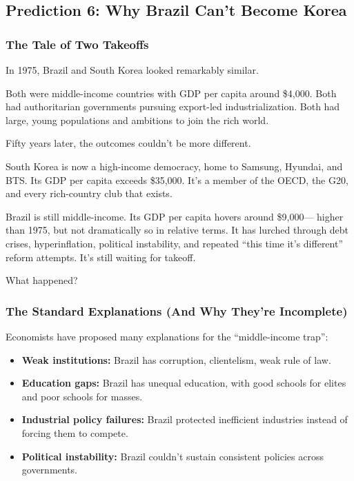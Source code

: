 \subsection{Prediction 6: Why Brazil Can't Become Korea}
\label{subsec:pred6-coherence-trap}


\subsubsection{The Tale of Two Takeoffs}

In 1975, Brazil and South Korea looked remarkably similar.

Both were middle-income countries with GDP per capita around \$4,000. 
Both had authoritarian governments pursuing export-led industrialization. 
Both had large, young populations and ambitions to join the rich world.

Fifty years later, the outcomes couldn't be more different.

South Korea is now a high-income democracy, home to Samsung, Hyundai, 
and BTS. Its GDP per capita exceeds \$35,000. It's a member of the OECD, 
the G20, and every rich-country club that exists.

Brazil is still middle-income. Its GDP per capita hovers around \$9,000---
higher than 1975, but not dramatically so in relative terms. It has 
lurched through debt crises, hyperinflation, political instability, 
and repeated ``this time it's different'' reform attempts. It's still 
waiting for takeoff.

What happened?

\subsubsection{The Standard Explanations (And Why They're Incomplete)}

Economists have proposed many explanations for the ``middle-income trap'':

\begin{itemize}
    \item \textbf{Weak institutions:} Brazil has corruption, clientelism, 
    weak rule of law.
    \item \textbf{Education gaps:} Brazil has unequal education, with 
    good schools for elites and poor schools for masses.
    \item \textbf{Industrial policy failures:} Brazil protected inefficient 
    industries instead of forcing them to compete.
    \item \textbf{Political instability:} Brazil couldn't sustain consistent 
    policies across governments.
\end{itemize}


